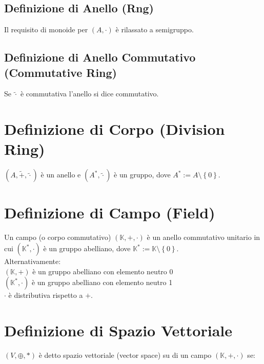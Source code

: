 \documentclass[a4paper, twoside, italian, 11pt]{book}
\newcommand{\braces}[1] {\left\{#1\right\}}
\newcommand{\K}{\mathbb{K}}
\begin{document}
\subsection{Definizione di Anello (Rng)}

Il requisito di monoide per $(A, \cdot)$ è rilassato a semigruppo.


\subsection{Definizione di Anello Commutativo (Commutative Ring)}

Se $\tilde{\cdot}$ è commutativa l'anello si dice commutativo.



\section{Definizione di Corpo (Division Ring)}

$(A, \tilde{+}, \tilde{\cdot})$ è un anello e $(A^*, \tilde{\cdot})$ è un gruppo, dove $A^* := A \setminus \braces{0}$. \\



\section{Definizione di Campo (Field)}

Un campo (o corpo commutativo) $(\K, +, \cdot)$ è un anello commutativo unitario in cui $(\K^*, \cdot)$ è un gruppo abelliano, dove $\K^* := \K \setminus \braces{0}$. \\

\noindent
Alternativamente: \\

$(\K, +)$ è un gruppo abelliano con elemento neutro 0 \\
\indent
$(\K^*, \cdot)$ è un gruppo abelliano con elemento neutro 1 \\
\indent
$\cdot$ è distributiva rispetto a $+$.





\section{Definizione di Spazio Vettoriale}

$(V, \oplus, *)$ è detto spazio vettoriale (vector space) su di un campo $(\K, +, \cdot)$ se: \\
\end{document}

